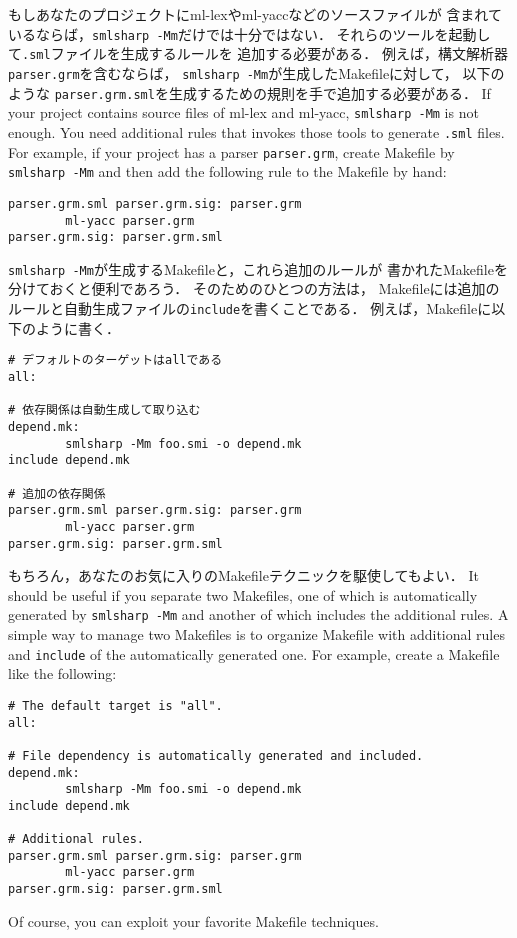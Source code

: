 \documentclass{jbook}
\begin{document}
\ifjp%
	もしあなたのプロジェクトにml-lexやml-yaccなどのソースファイルが
含まれているならば，{\tt smlsharp -Mm}だけでは十分ではない．
	それらのツールを起動して{\tt .sml}ファイルを生成するルールを
追加する必要がある．
        例えば，構文解析器{\tt parser.grm}を含むならば，
{\tt smlsharp -Mm}が生成したMakefileに対して，
以下のような
{\tt parser.grm.sml}を生成するための規則を手で追加する必要がある．
\else%
	If your project contains source files of ml-lex and ml-yacc,
{\tt smlsharp -Mm} is not enough.
	You need additional rules that invokes those tools to generate
{\tt .sml} files.
	For example, if your project has a parser {\tt parser.grm},
create Makefile by {\tt smlsharp -Mm} and then
add the following rule to the Makefile by hand:
\fi%
\begin{verbatim}
parser.grm.sml parser.grm.sig: parser.grm
        ml-yacc parser.grm
parser.grm.sig: parser.grm.sml
\end{verbatim}
\ifjp%
        {\tt smlsharp -Mm}が生成するMakefileと，これら追加のルールが
書かれたMakefileを分けておくと便利であろう．
	そのためのひとつの方法は，
Makefileには追加のルールと自動生成ファイルの{\tt include}を書くことである．
	例えば，Makefileに以下のように書く．
\begin{verbatim}
# デフォルトのターゲットはallである
all:

# 依存関係は自動生成して取り込む
depend.mk:
        smlsharp -Mm foo.smi -o depend.mk
include depend.mk

# 追加の依存関係
parser.grm.sml parser.grm.sig: parser.grm
        ml-yacc parser.grm
parser.grm.sig: parser.grm.sml
\end{verbatim}
	もちろん，あなたのお気に入りのMakefileテクニックを駆使してもよい．
\else%
        It should be useful if you separate two Makefiles,
one of which is automatically generated by {\tt smlsharp -Mm} and
another of which includes the additional rules.
	A simple way to manage two Makefiles is
to organize Makefile with additional rules and {\tt include} of the
automatically generated one.
	For example, create a Makefile like the following:
\begin{verbatim}
# The default target is "all".
all:

# File dependency is automatically generated and included.
depend.mk:
        smlsharp -Mm foo.smi -o depend.mk
include depend.mk

# Additional rules.
parser.grm.sml parser.grm.sig: parser.grm
        ml-yacc parser.grm
parser.grm.sig: parser.grm.sml
\end{verbatim}
	Of course, you can exploit your favorite Makefile techniques.
\fi%
\end{document}
